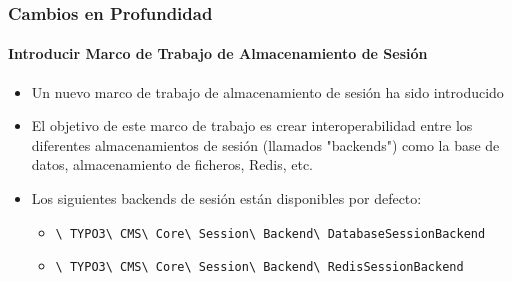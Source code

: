 
\begin{frame}[fragile]
	\frametitle{Cambios en Profundidad}
	\framesubtitle{Introducir Marco de Trabajo de Almacenamiento de Sesión}

	\begin{itemize}
		\item Un nuevo marco de trabajo de almacenamiento de sesión ha sido introducido
		\item El objetivo de este marco de trabajo es crear interoperabilidad entre los diferentes almacenamientos de sesión
			(llamados "backends") como la base de datos, almacenamiento de ficheros, Redis, etc.
		\item Los siguientes backends de sesión están disponibles por defecto:

			\begin{itemize}
				\item
					\smaller\texttt{\textbackslash
						TYPO3\textbackslash
						CMS\textbackslash
						Core\textbackslash
						Session\textbackslash
						Backend\textbackslash
						DatabaseSessionBackend}

				\item
					\texttt{\textbackslash
						TYPO3\textbackslash
						CMS\textbackslash
						Core\textbackslash
						Session\textbackslash
						Backend\textbackslash
						RedisSessionBackend}
			\end{itemize}
	\end{itemize}

\end{frame}


